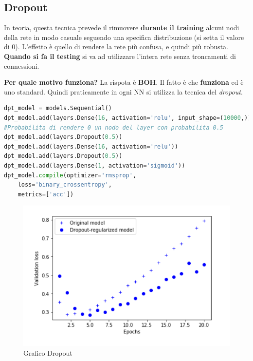 \subsection{Dropout}
\label{subsec:dropout}

In teoria, questa tecnica prevede il rimuovere \textbf{durante il training} alcuni nodi della rete in modo casuale seguendo 
una specifica distribuzione (si setta il valore di 0). L'effetto è quello di rendere 
la rete più confusa, e quindi più robusta. \textbf{Quando si fa il testing} si va ad utilizzare l'intera rete senza
troncamenti di connessioni.

\textbf{Per quale motivo funziona?} La rispota è \textbf{BOH}. Il fatto è che \textbf{funziona} ed è uno standard. Quindi praticamente 
in ogni NN si utilizza la tecnica del \textit{dropout}.

\begin{lstlisting}[language=Python]
dpt_model = models.Sequential()
dpt_model.add(layers.Dense(16, activation='relu', input_shape=(10000,)))
#Probabilita di rendere 0 un nodo del layer con probabilita 0.5
dpt_model.add(layers.Dropout(0.5))
dpt_model.add(layers.Dense(16, activation='relu'))
dpt_model.add(layers.Dropout(0.5))
dpt_model.add(layers.Dense(1, activation='sigmoid'))
dpt_model.compile(optimizer='rmsprop',
    loss='binary_crossentropy',
    metrics=['acc'])
\end{lstlisting}

\begin{figure}[H]
    \centering
    \includegraphics[scale=0.5]{images/dropout.png}
    \caption{Grafico Dropout}
    \label{fig:dropout}
\end{figure}

\newpage